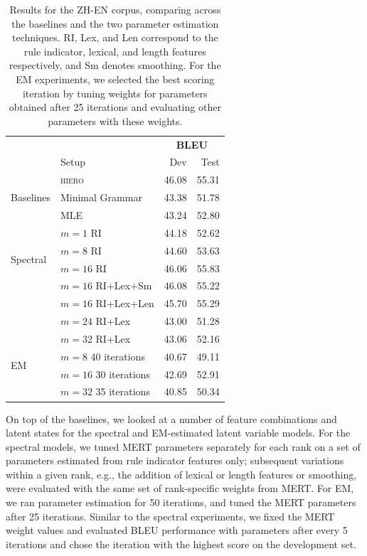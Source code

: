 \documentclass[11pt]{article}
\begin{document}
\begin{table}[t!]
\begin{small}
  \begin{center}
    \begin{tabular}{|l|p{}rr|}
      \hline
	  & & \multicolumn{2}{c|}{\bf BLEU} \\
      & Setup & Dev & Test \\
	  \hline
	  \multirow{3}{*}{Baselines} & \textsc{hiero} & 46.08 & 55.31 \\
      & Minimal Grammar & 43.38 & 51.78 \\
	  & MLE & 43.24 & 52.80 \\ \hline
	  \multirow{4}{*}{Spectral} &  $m=1$ RI & 44.18 & 52.62 \\
	  & $m=8$ RI & 44.60 & 53.63 \\
	  & $m=16$ RI & 46.06 & 55.83 \\
	  & $m=16$ RI+Lex+Sm & 46.08 & 55.22 \\ 
	  & $m=16$ RI+Lex+Len & 45.70 & 55.29 \\ 
	  & $m=24$ RI+Lex & 43.00 & 51.28 \\ 
	  & $m=32$ RI+Lex & 43.06 & 52.16 \\ \hline
	  \multirow{2}{*}{EM} & $m=8$ 40 iterations & 40.67 & 49.11 \\
	  & $m=16$ 30 iterations & 42.69 & 52.91 \\
	  & $m=32$ 35  iterations & 40.85 & 50.34 \\
	  \hline
	\end{tabular}
  \end{center}
  \caption{Results for the \textsc{ZH-EN} corpus, comparing across the baselines and the two parameter estimation techniques.
  RI, Lex, and Len correspond to the rule indicator, lexical, and length features respectively, and Sm denotes smoothing.
  For the EM experiments, we selected the best scoring iteration by tuning weights for parameters obtained after 25 iterations and evaluating other parameters with these weights. }
  \label{tab:zh-en-results}
\end{small}
\end{table}

On top of the baselines, we looked at a number of feature combinations and latent states for the spectral and EM-estimated latent variable models.  
For the spectral models, we tuned MERT parameters separately for each rank on a set of parameters estimated from rule indicator features only; subsequent variations within a given rank, e.g., the addition of lexical or length features or smoothing, were evaluated with the same set of rank-specific weights from MERT. 
For EM, we ran parameter estimation for 50 iterations, and tuned the MERT parameters after 25 iterations. 
Similar to the spectral experiments, we fixed the MERT weight values and evaluated BLEU performance with parameters after every 5 iterations and chose the iteration with the highest score on the development set. 
\end{document}
